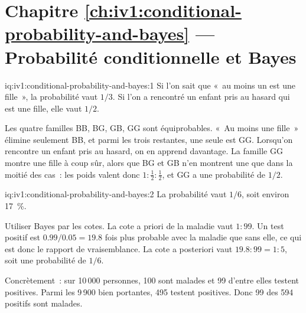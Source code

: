 \section*{Chapitre \ref{ch:iv1:conditional-probability-and-bayes} --- Probabilité conditionnelle et Bayes}

\begin{solution}{iq:iv1:conditional-probability-and-bayes:1}
Si l'on sait que «~au moins un est une fille~», la probabilité vaut $1/3$. Si l'on a rencontré un enfant pris au hasard qui est une fille, elle vaut $1/2$.

Les quatre familles BB, BG, GB, GG sont équiprobables. «~Au moins une fille~» élimine seulement BB, et parmi les trois restantes, une seule est GG. Lorsqu'on rencontre un enfant pris au hasard, on en apprend davantage. La famille GG montre une fille à coup sûr, alors que BG et GB n'en montrent une que dans la moitié des cas~: les poids valent donc $1 : \tfrac12 : \tfrac12$, et GG a une probabilité de $1/2$.

\end{solution}

\enlargethispage{-3\baselineskip}%
\begin{solution}{iq:iv1:conditional-probability-and-bayes:2}
La probabilité vaut $1/6$, soit environ 17~\%.

Utiliser Bayes par les cotes. La cote a priori de la maladie vaut $1 : 99$. Un test positif est $0.99/0.05 = 19.8$ fois plus probable avec la maladie que sans elle, ce qui est donc le rapport de vraisemblance. La cote a posteriori vaut $19.8 : 99 = 1 : 5$, soit une probabilité de $1/6$.

Concrètement~: sur 10\,000 personnes, 100 sont malades et 99 d'entre elles testent positives. Parmi les 9\,900 bien portantes, 495 testent positives. Donc 99 des 594 positifs sont malades.

\end{solution}

